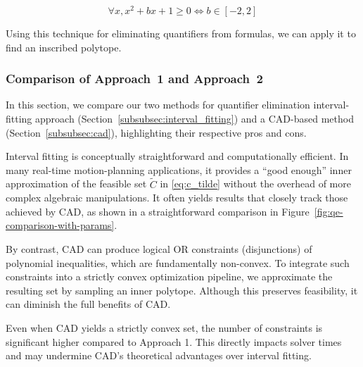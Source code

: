 \[ \forall x, x^2 + bx + 1 \geq 0 \iff b \in [-2, 2] \]

Using this technique for
eliminating quantifiers from formulas, we can apply it to find an inscribed polytope.

\subsubsection{Comparison of Approach~1 and Approach~2}
\label{subsubsec:comparison_approaches}

In this section, we compare our two methods for quantifier elimination interval-fitting approach (Section~\ref{subsubsec:interval_fitting}) and a
CAD-based method (Section~\ref{subsubsec:cad}), highlighting their respective pros and cons.

Interval fitting is conceptually straightforward and computationally efficient.
In many real-time motion-planning applications, it provides a “good enough” inner approximation of the feasible set $\tilde{C}$ in \eqref{eq:c_tilde}
without the overhead of more complex algebraic manipulations.
It often yields results that closely track those achieved by CAD, as shown in a straightforward comparison in
Figure~\ref{fig:qe-comparison-with-params}.

By contrast, CAD can produce logical OR constraints (disjunctions) of polynomial inequalities, which are fundamentally non-convex.
To integrate such constraints into a strictly convex optimization pipeline, we approximate the resulting set by sampling an inner polytope.
Although this preserves feasibility, it can diminish the full benefits of CAD.

Even when CAD yields a strictly convex set, the number of constraints is significant higher compared to Approach 1.
This directly impacts solver times and may undermine CAD's theoretical advantages over interval fitting.

